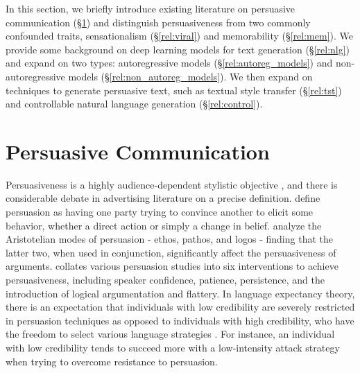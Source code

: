 In this section, we briefly introduce existing literature on persuasive communication (\S\ref{rel:pers}) and distinguish persuasiveness from two commonly confounded traits, sensationalism (\S\ref{rel:viral}) and memorability (\S\ref{rel:mem}). We provide some background on deep learning models for text generation (\S\ref{rel:nlg}) and expand on two types: autoregressive models (\S\ref{rel:autoreg_models}) and non-autoregressive models (\S\ref{rel:non_autoreg_models}). We then expand on techniques to generate persuasive text, such as textual style transfer (\S\ref{rel:tst}) and controllable natural language generation (\S\ref{rel:control}).

\section{Persuasive Communication}
\label{rel:pers}
Persuasiveness is a highly audience-dependent stylistic objective \citep{duerr-2021}, and there is considerable debate in advertising literature on a precise definition. \citet{iyer2019unsupervised} define persuasion as having one party trying to convince another to elicit some behavior, whether a direct action or simply a change in belief. \citet{hidey-etal-2017-analyzing} analyze the Aristotelian modes of persuasion - ethos, pathos, and logos - finding that the latter two, when used in conjunction, significantly affect the persuasiveness of arguments. \citet{demers_2016} collates various persuasion studies into six interventions to achieve persuasiveness, including speaker confidence, patience, persistence, and the introduction of logical argumentation and flattery. In language expectancy theory, there is an expectation that individuals with low credibility are severely restricted in persuasion techniques as opposed to individuals with high credibility, who have the freedom to select various language strategies \citep{burgoon1993interpersonal}. For instance, an individual with low credibility tends to succeed more with a low-intensity attack strategy when trying to overcome resistance to persuasion.

